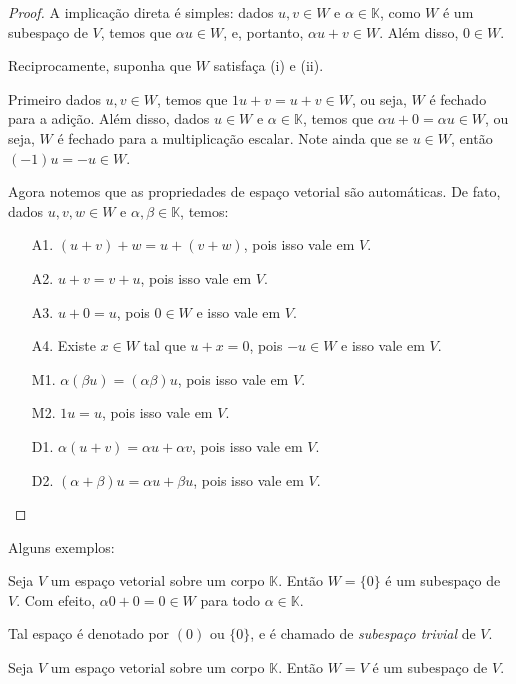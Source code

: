 \begin{proof}
    A implicação direta é simples: dados $u, v \in W$ e $\alpha \in \mathbb K$, como $W$ é um subespaço de $V$, temos que $\alpha u \in W$, e, portanto, $\alpha u + v \in W$.
    Além disso, $0 \in W$.

    Reciprocamente, suponha que $W$ satisfaça (i) e (ii).

    Primeiro dados $u, v \in W$, temos que $1 u + v = u + v \in W$, ou seja, $W$ é fechado para a adição.
    Além disso, dados $u \in W$ e $\alpha \in \mathbb K$, temos que $\alpha u + 0 = \alpha u \in W$, ou seja, $W$ é fechado para a multiplicação escalar.
    Note ainda que se $u \in W$, então $(-1)u=-u\in W$.

    Agora notemos que as propriedades de espaço vetorial são automáticas.
    De fato, dados $u, v, w \in W$ e $\alpha, \beta \in \mathbb K$, temos:

    \begin{itemize}
        \item[A1.] $(u + v) + w = u+(v+w)$, pois isso vale em $V$.
        \item[A2.] $u + v = v + u$, pois isso vale em $V$.
        \item[A3.] $u + 0 = u$, pois $0 \in W$ e isso vale em $V$.
        \item[A4.] Existe $x \in W$ tal que $u + x = 0$, pois $-u \in W$ e isso vale em $V$.
        \item[M1.] $\alpha(\beta u) = (\alpha \beta)u$, pois isso vale em $V$.
        \item[M2.] $1 u = u$, pois isso vale em $V$.
        \item[D1.] $\alpha(u + v) = \alpha u + \alpha v$, pois isso vale em $V$.
        \item[D2.] $(\alpha + \beta)u = \alpha u + \beta u$, pois isso vale em $V$. 
    \end{itemize}
\end{proof}

Alguns exemplos:

\begin{example}
    Seja $V$ um espaço vetorial sobre um corpo $\mathbb K$.
    Então $W=\{0\}$ é um subespaço de $V$.
    Com efeito, $\alpha0+0=0\in W$ para todo $\alpha \in \mathbb K$.

    Tal espaço é denotado por $(0)$ ou $\{0\}$, e é chamado de \emph{subespaço trivial} de $V$.
\end{example}

\begin{example}
    Seja $V$ um espaço vetorial sobre um corpo $\mathbb K$.
    Então $W=V$ é um subespaço de $V$.
\end{example}

